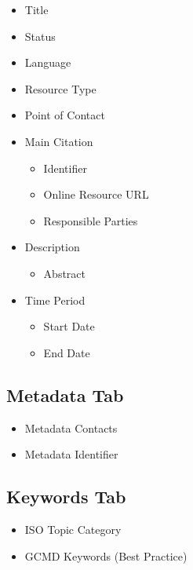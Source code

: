 \documentclass[
]{book}
\providecommand{\tightlist}{%
  \setlength{\itemsep}{0pt}\setlength{\parskip}{0pt}}
\begin{document}
\begin{itemize}
\tightlist
\item
  Title
\item
  Status
\item
  Language
\item
  Resource Type
\item
  Point of Contact
\item
  Main Citation

  \begin{itemize}
  \tightlist
  \item
    Identifier
  \item
    Online Resource URL
  \item
    Responsible Parties
  \end{itemize}
\item
  Description

  \begin{itemize}
  \tightlist
  \item
    Abstract
  \end{itemize}
\item
  Time Period

  \begin{itemize}
  \tightlist
  \item
    Start Date
  \item
    End Date
  \end{itemize}
\end{itemize}

\hypertarget{metadata-tab-1}{%
\subsection{Metadata Tab}\label{metadata-tab-1}}

\begin{itemize}
\tightlist
\item
  Metadata Contacts
\item
  Metadata Identifier
\end{itemize}

\hypertarget{keywords-tab-1}{%
\subsection{Keywords Tab}\label{keywords-tab-1}}

\begin{itemize}
\tightlist
\item
  ISO Topic Category
\item
  GCMD Keywords (Best Practice)
\end{itemize}
\end{document}
